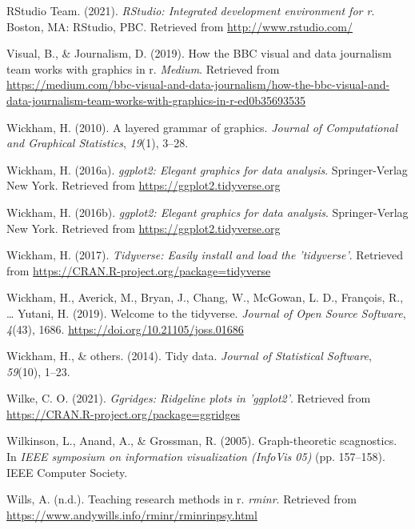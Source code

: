 \documentclass[
  english,
  doc,floatsintext]{apa6}
\newlength{\cslhangindent}
\newenvironment{CSLReferences}[2] %
 {%
  \setlength{\parindent}{0pt}
  \ifodd #1 \everypar{\setlength{\hangindent}{\cslhangindent}}\ignorespaces\fi
  \ifnum #2 > 0
  \setlength{\parskip}{#2\baselineskip}
  \fi
 }%
 {}
\begin{document}
\begin{CSLReferences}{1}{0}
\leavevmode{}%
RStudio Team. (2021). \emph{RStudio: Integrated development environment for r}. Boston, MA: RStudio, PBC. Retrieved from \url{http://www.rstudio.com/}

\leavevmode{}%
Visual, B., \& Journalism, D. (2019). How the BBC visual and data journalism team works with graphics in r. \emph{Medium}. Retrieved from \url{https://medium.com/bbc-visual-and-data-journalism/how-the-bbc-visual-and-data-journalism-team-works-with-graphics-in-r-ed0b35693535}

\leavevmode{}%
Wickham, H. (2010). A layered grammar of graphics. \emph{Journal of Computational and Graphical Statistics}, \emph{19}(1), 3--28.

\leavevmode{}%
Wickham, H. (2016a). \emph{ggplot2: Elegant graphics for data analysis}. Springer-Verlag New York. Retrieved from \url{https://ggplot2.tidyverse.org}

\leavevmode{}%
Wickham, H. (2016b). \emph{ggplot2: Elegant graphics for data analysis}. Springer-Verlag New York. Retrieved from \url{https://ggplot2.tidyverse.org}

\leavevmode{}%
Wickham, H. (2017). \emph{Tidyverse: Easily install and load the 'tidyverse'}. Retrieved from \url{https://CRAN.R-project.org/package=tidyverse}

\leavevmode{}%
Wickham, H., Averick, M., Bryan, J., Chang, W., McGowan, L. D., François, R., \ldots{} Yutani, H. (2019). Welcome to the {tidyverse}. \emph{Journal of Open Source Software}, \emph{4}(43), 1686. \url{https://doi.org/10.21105/joss.01686}

\leavevmode{}%
Wickham, H., \& others. (2014). Tidy data. \emph{Journal of Statistical Software}, \emph{59}(10), 1--23.

\leavevmode{}%
Wilke, C. O. (2021). \emph{Ggridges: Ridgeline plots in 'ggplot2'}. Retrieved from \url{https://CRAN.R-project.org/package=ggridges}

\leavevmode{}%
Wilkinson, L., Anand, A., \& Grossman, R. (2005). Graph-theoretic scagnostics. In \emph{IEEE symposium on information visualization (InfoVis 05)} (pp. 157--158). IEEE Computer Society.

\leavevmode{}%
Wills, A. (n.d.). Teaching research methods in r. \emph{rminr}. Retrieved from \url{https://www.andywills.info/rminr/rminrinpsy.html}

\end{CSLReferences}

\endgroup
\end{document}
